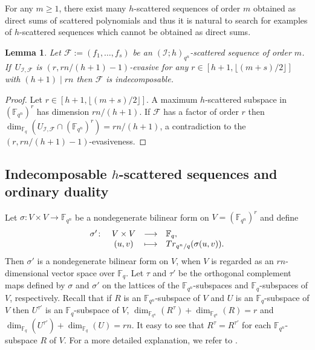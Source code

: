 \documentclass[11pt]{article}
\newtheorem{lemma}[theo]{Lemma}
\theoremstyle{definition}
\numberwithin{equation}{section}
\begin{document}
For any $m\geq 1$, there exist many $h$-scattered sequences of order $m$ obtained as direct sums of scattered polynomials and thus it is  natural to search for examples of $h$-scattered sequences which cannot be obtained as direct sums. 

\begin{lemma}\label{Lemma:ind}
Let  $\mathcal{F}:=(f_1,\ldots,f_s)$ be an  $(\mathcal I;h)_{q^n}$-scattered sequence of order $m$. If~$U_{\mathcal I,\mathcal{F}}$ is $(r,rn/(h+1)-1)$-evasive for any $r\in [h+1,\lfloor (m+s)/2\rfloor ]$ with $(h+1)\mid rn$ then $\mathcal{F}$ is indecomposable.
\end{lemma}
\begin{proof}
Let $r\in [h+1,\lfloor (m+s)/2\rfloor ]$. A maximum $h$-scattered subspace in $(\mathbb{F}_{q^n})^{r}$ has dimension $rn/(h+1)$. If $\mathcal{F}$ has a factor of   order $r$ then $\dim_{\mathbb{F}_q}(U_{\mathcal I,\mathcal{F}}\cap (\mathbb{F}_{q^n})^{r})=rn/(h+1)$, a contradiction to the   $(r,rn/(h+1)-1)$-evasiveness. 
\end{proof}

\subsection{Indecomposable \texorpdfstring{$h$}{h}-scattered sequences and ordinary duality}

Let \mbox{$\sigma\colon V\times V\longrightarrow {\mathbb F}_{q^n}$} be a nondegenerate
	bilinear form on $V=(\mathbb{F}_{q^n})^{r}$ and define
	\[ \begin{array}{rccl}
		\sigma' \colon & V\times V &\longrightarrow & \mathbb{F}_q,\\
       &({u}, { v}) 	& \longmapsto &	{\rm Tr}_{q^n/q}(\sigma({u}, {v})).
	\end{array} \]
	Then $\sigma'$ is a nondegenerate bilinear form on
	$V$, when $V$ is  regarded as an $rn$-dimensional vector space  over
	$\mathbb{F}_q$. Let $\tau$ and $\tau'$ be the orthogonal complement maps
	defined by $\sigma$ and $\sigma'$ on the lattices  of the
	$\mathbb{F}_{q^n}$-subspaces and $\mathbb{F}_q$-subspaces of $V$, respectively.
	Recall that  if $R$ is an
	${\mathbb F}_{q^n}$-subspace of $V$ and $U$ is an $\mathbb{F}_q$-subspace of $V$
	then $U^{\tau'}$ is an $\mathbb{F}_q$-subspace of $V$, $\dim_{{\mathbb F}_{q^n}}(R^\tau)+\dim_{{\mathbb F}_{q^n}}(R)=r$ and
	$\dim_{\mathbb{F}_q} (U^{\tau'})+\dim_{\mathbb{F}_q} (U)= rn$. It easy to see
	that $R^\tau=R^{\tau'}$ for each ${\mathbb F}_{q^n}$-subspace $R$ of $V$. For a more detailed explanation, we refer to \cite[Chapter 7]{taylor1992geometry}.
	
\end{document}
